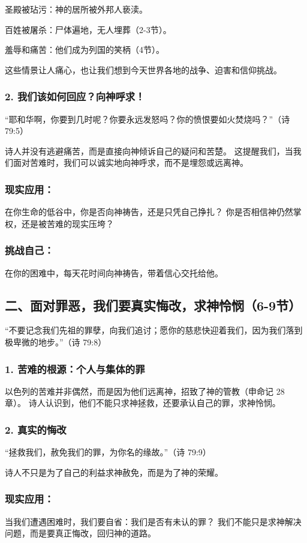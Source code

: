 \documentclass[a4paper, 12pt]{article}
\begin{document}
圣殿被玷污：神的居所被外邦人亵渎。

百姓被屠杀：尸体遍地，无人埋葬（2-3节）。

羞辱和痛苦：他们成为列国的笑柄（4节）。

这些情景让人痛心，也让我们想到今天世界各地的战争、迫害和信仰挑战。

\subsubsection*{2. 我们该如何回应？向神呼求！}
“耶和华啊，你要到几时呢？你要永远发怒吗？你的愤恨要如火焚烧吗？”（诗 79:5）

诗人并没有逃避痛苦，而是直接向神倾诉自己的疑问和苦楚。
这提醒我们，当我们面对苦难时，我们可以诚实地向神呼求，而不是埋怨或远离神。
\subsubsection*{现实应用：}
在你生命的低谷中，你是否向神祷告，还是只凭自己挣扎？
你是否相信神仍然掌权，还是被苦难的现实压垮？
\subsubsection*{挑战自己：}

在你的困难中，每天花时间向神祷告，带着信心交托给他。
\subsection*{二、面对罪恶，我们要真实悔改，求神怜悯（6-9节）}
“不要记念我们先祖的罪孽，向我们追讨；愿你的慈悲快迎着我们，因为我们落到极卑微的地步。”（诗 79:8）

\subsubsection*{1. 苦难的根源：个人与集体的罪}
以色列的苦难并非偶然，而是因为他们远离神，招致了神的管教（申命记 28 章）。
诗人认识到，他们不能只求神拯救，还要承认自己的罪，求神怜悯。
\subsubsection*{2. 真实的悔改}
“拯救我们，赦免我们的罪，为你名的缘故。”（诗 79:9）

诗人不只是为了自己的利益求神赦免，而是为了神的荣耀。
\subsubsection*{现实应用：}
当我们遭遇困难时，我们要自省：我们是否有未认的罪？
我们不能只是求神解决问题，而是要真正悔改，回归神的道路。
\end{document}
